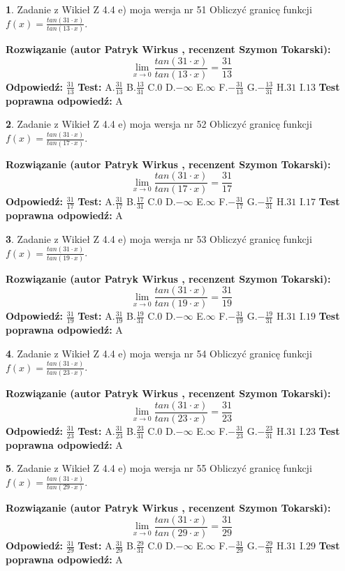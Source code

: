 \documentclass[12pt, a4paper]{article}
\theoremstyle{definition} %
\newtheorem{zad}{}
\newcommand{\zadStart}[1]{\begin{zad}#1\newline}
\newcommand{\zadStop}{\end{zad}}
\newcommand{\rozwStart}[2]{\noindent \textbf{Rozwiązanie (autor #1 , recenzent #2): }\newline}
\newcommand{\rozwStop}{\newline}
\newcommand{\odpStart}{\noindent \textbf{Odpowiedź:}\newline}
\newcommand{\odpStop}{\newline}
\newcommand{\testStart}{\noindent \textbf{Test:}\newline}
\newcommand{\testStop}{\newline}
\newcommand{\kluczStart}{\noindent \textbf{Test poprawna odpowiedź:}\newline}
\newcommand{\kluczStop}{\newline}
\begin{document}
\zadStart{Zadanie z Wikieł Z 4.4 e) moja wersja nr 51}
Obliczyć granicę funkcji $f(x)=\frac{tan(31\cdot x)}{tan(13\cdot x)}$.
\zadStop
\rozwStart{Patryk Wirkus}{Szymon Tokarski}
$$\lim\limits_{x\to 0}\frac{tan(31\cdot x)}{tan(13\cdot x)}=
\frac{31}{13}$$
\rozwStop
\odpStart
$\frac{31}{13}$
\odpStop
\testStart
A.$\frac{31}{13}$
B.$\frac{13}{31}$
C.$0$
D.$-\infty$
E.$\infty$
F.$-\frac{31}{13}$
G.$-\frac{13}{31}$
H.$31$
I.$13$
\testStop
\kluczStart
A
\kluczStop



\zadStart{Zadanie z Wikieł Z 4.4 e) moja wersja nr 52}
Obliczyć granicę funkcji $f(x)=\frac{tan(31\cdot x)}{tan(17\cdot x)}$.
\zadStop
\rozwStart{Patryk Wirkus}{Szymon Tokarski}
$$\lim\limits_{x\to 0}\frac{tan(31\cdot x)}{tan(17\cdot x)}=
\frac{31}{17}$$
\rozwStop
\odpStart
$\frac{31}{17}$
\odpStop
\testStart
A.$\frac{31}{17}$
B.$\frac{17}{31}$
C.$0$
D.$-\infty$
E.$\infty$
F.$-\frac{31}{17}$
G.$-\frac{17}{31}$
H.$31$
I.$17$
\testStop
\kluczStart
A
\kluczStop



\zadStart{Zadanie z Wikieł Z 4.4 e) moja wersja nr 53}
Obliczyć granicę funkcji $f(x)=\frac{tan(31\cdot x)}{tan(19\cdot x)}$.
\zadStop
\rozwStart{Patryk Wirkus}{Szymon Tokarski}
$$\lim\limits_{x\to 0}\frac{tan(31\cdot x)}{tan(19\cdot x)}=
\frac{31}{19}$$
\rozwStop
\odpStart
$\frac{31}{19}$
\odpStop
\testStart
A.$\frac{31}{19}$
B.$\frac{19}{31}$
C.$0$
D.$-\infty$
E.$\infty$
F.$-\frac{31}{19}$
G.$-\frac{19}{31}$
H.$31$
I.$19$
\testStop
\kluczStart
A
\kluczStop



\zadStart{Zadanie z Wikieł Z 4.4 e) moja wersja nr 54}
Obliczyć granicę funkcji $f(x)=\frac{tan(31\cdot x)}{tan(23\cdot x)}$.
\zadStop
\rozwStart{Patryk Wirkus}{Szymon Tokarski}
$$\lim\limits_{x\to 0}\frac{tan(31\cdot x)}{tan(23\cdot x)}=
\frac{31}{23}$$
\rozwStop
\odpStart
$\frac{31}{23}$
\odpStop
\testStart
A.$\frac{31}{23}$
B.$\frac{23}{31}$
C.$0$
D.$-\infty$
E.$\infty$
F.$-\frac{31}{23}$
G.$-\frac{23}{31}$
H.$31$
I.$23$
\testStop
\kluczStart
A
\kluczStop



\zadStart{Zadanie z Wikieł Z 4.4 e) moja wersja nr 55}
Obliczyć granicę funkcji $f(x)=\frac{tan(31\cdot x)}{tan(29\cdot x)}$.
\zadStop
\rozwStart{Patryk Wirkus}{Szymon Tokarski}
$$\lim\limits_{x\to 0}\frac{tan(31\cdot x)}{tan(29\cdot x)}=
\frac{31}{29}$$
\rozwStop
\odpStart
$\frac{31}{29}$
\odpStop
\testStart
A.$\frac{31}{29}$
B.$\frac{29}{31}$
C.$0$
D.$-\infty$
E.$\infty$
F.$-\frac{31}{29}$
G.$-\frac{29}{31}$
H.$31$
I.$29$
\testStop
\kluczStart
A
\kluczStop
\end{document}
